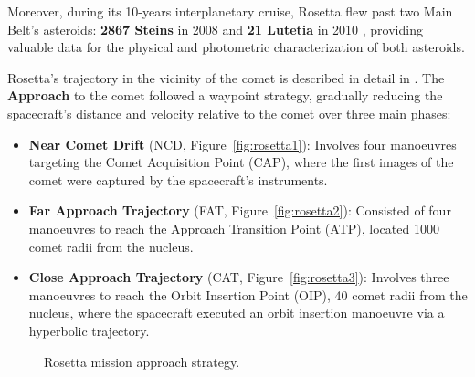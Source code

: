 \documentclass{Configuration_gigi/PoliMi3i_thesis}
\begin{document}
Moreover, during its 10-years interplanetary cruise, Rosetta flew past two Main Belt's asteroids: \textbf{2867 Steins} in 2008 \cite{rosetta_steins} and \textbf{21 Lutetia} in 2010 \cite{rosetta_lutetia}, providing valuable data for the physical and photometric characterization of both asteroids.

Rosetta's trajectory in the vicinity of the comet is described in detail in \cite{rosettaFD}. The \textbf{Approach} to the comet followed a waypoint strategy, gradually reducing the spacecraft’s distance and velocity relative to the comet over three main phases:

\begin{itemize}
    \item \textbf{Near Comet Drift} (NCD, Figure~\ref{fig:rosetta1}): Involves four manoeuvres targeting the Comet Acquisition Point (CAP), where the first images of the comet were captured by the spacecraft's instruments.
    \item \textbf{Far Approach Trajectory} (FAT, Figure~\ref{fig:rosetta2}): Consisted of four manoeuvres to reach the Approach Transition Point (ATP), located 1000 comet radii from the nucleus.
    \item \textbf{Close Approach Trajectory} (CAT, Figure~\ref{fig:rosetta3}): Involves three manoeuvres to reach the Orbit Insertion Point (OIP), 40 comet radii from the nucleus, where the spacecraft executed an orbit insertion manoeuvre via a hyperbolic trajectory.
\end{itemize}

\begin{figure}[H]
    \centering
    \caption[Rosetta approach phase.]{Rosetta mission approach strategy.}
    \label{fig:rosettaAPP}
\end{figure}
\end{document}
